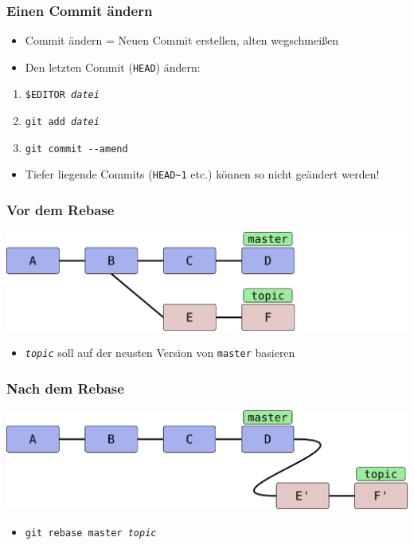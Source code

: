 \documentclass{beamer}
\begin{document}
\begin{frame}
 \frametitle{Einen Commit ändern}



\begin{itemize}
	\item Commit ändern = Neuen Commit erstellen, alten wegschmeißen
	\item Den letzten Commit (\texttt{HEAD}) ändern:
\end{itemize}

\begin{enumerate}
	\item \texttt{\$EDITOR \emph{datei}}
	\item \texttt{git add \emph{datei}}
	\item \texttt{git commit -{}-amend}
\end{enumerate}

\begin{itemize}
	\item Tiefer liegende Commits (\texttt{HEAD\textasciitilde{}1} etc.) können so nicht geändert werden!
\end{itemize}


 \end{frame}
\begin{frame}
 \frametitle{Vor dem Rebase}



\begin{center}
\includegraphics[scale=0.12]{bilder/rebase-vorher.pdf}
\end{center}

\begin{itemize}
	\item \texttt{\emph{topic}} soll auf der neusten Version von \texttt{master} basieren
\end{itemize}


 \end{frame}
\begin{frame}
 \frametitle{Nach dem Rebase}



\begin{center}
\includegraphics[scale=0.12]{bilder/rebase-nachher.pdf}
\end{center}

\begin{itemize}
	\item \texttt{git rebase master \emph{topic}}
\end{itemize}


 \end{frame}
\end{document}

